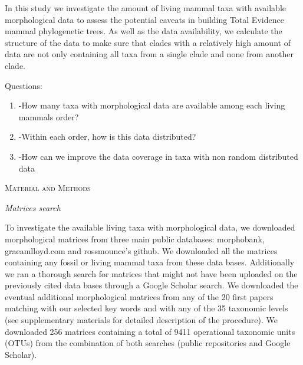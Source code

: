 \documentclass[12pt,letterpaper]{article}
\renewcommand{\section}[1]{%
\bigskip
\begin{center}
\begin{Large}
\normalfont\scshape #1
\medskip
\end{Large}
\end{center}}
\renewcommand{\subsection}[1]{%
\bigskip
\begin{center}
\begin{large}
\normalfont\itshape #1
\end{large}
\end{center}}
\begin{document}
In this study we investigate the amount of living mammal taxa with available morphological data to assess the potential caveats in building Total Evidence mammal phylogenetic trees. As well as the data availability, we calculate the structure of the data to make sure that clades with a relatively high amount of data are not only containing all taxa from a single clade and none from another clade.

Questions:
\begin{enumerate}
\item{-How many taxa with morphological data are available among each living mammals order?}
\item{-Within each order, how is this data distributed?}
\item{-How can we improve the data coverage in taxa with non random distributed data}
\end{enumerate}


%
%
 
\newpage

\section{Material and Methods}
\subsection{Matrices search}
To investigate the available living taxa with morphological data, we downloaded morphological matrices from three main public databases: morphobank, graeamlloyd.com and rossmounce's github. We downloaded all the matrices containing any fossil or living mammal taxa from these data bases. Additionally we ran a thorough search for matrices that might not have been uploaded on the previously cited data bases through a Google Scholar search. We downloaded the eventual additional morphological matrices from any of the 20 first papers matching with our selected key words and with any of the 35 taxonomic levels (see supplementary materials for detailed description of the procedure). We downloaded 256 %
matrices containing a total of 9411 %
operational taxonomic units (OTUs) from the combination of both searches (public repositories and Google Scholar).
\end{document}
